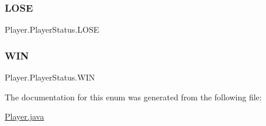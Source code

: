 \subsubsection{\texorpdfstring{L\+O\+SE}{LOSE}}
{\footnotesize\ttfamily Player.\+Player\+Status.\+L\+O\+SE}

\mbox{\label{enum_player_1_1_player_status_ae166cfbd33fea069302af235a51953b8}} 
\subsubsection{\texorpdfstring{W\+IN}{WIN}}
{\footnotesize\ttfamily Player.\+Player\+Status.\+W\+IN}



The documentation for this enum was generated from the following file\+:\begin{DoxyCompactItemize}
\item 
\mbox{\hyperlink{_player_8java}{Player.\+java}}\end{DoxyCompactItemize}
